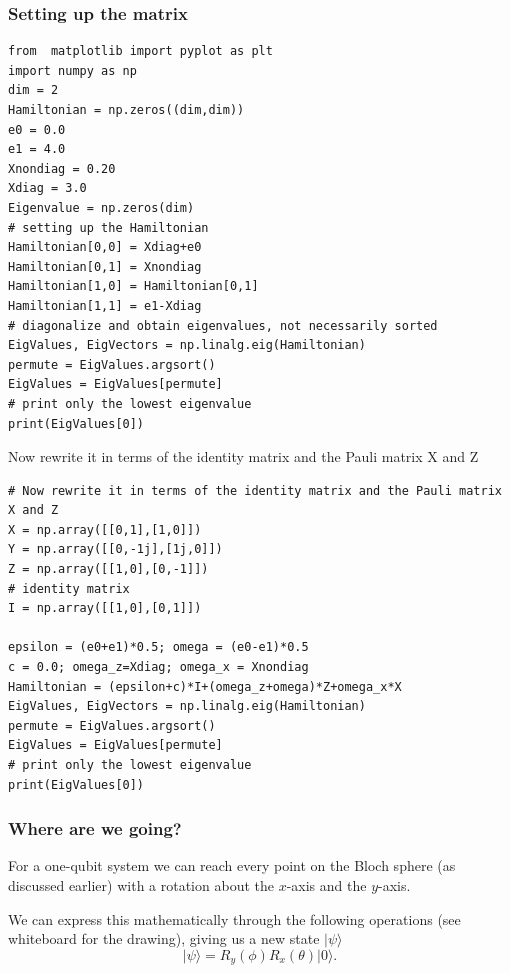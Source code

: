 \documentclass{beamer}
\begin{document}
\begin{frame}
\frametitle{Setting up the matrix}

\begin{verbatim}
from  matplotlib import pyplot as plt
import numpy as np
dim = 2
Hamiltonian = np.zeros((dim,dim))
e0 = 0.0
e1 = 4.0
Xnondiag = 0.20
Xdiag = 3.0
Eigenvalue = np.zeros(dim)
# setting up the Hamiltonian
Hamiltonian[0,0] = Xdiag+e0
Hamiltonian[0,1] = Xnondiag
Hamiltonian[1,0] = Hamiltonian[0,1]
Hamiltonian[1,1] = e1-Xdiag
# diagonalize and obtain eigenvalues, not necessarily sorted
EigValues, EigVectors = np.linalg.eig(Hamiltonian)
permute = EigValues.argsort()
EigValues = EigValues[permute]
# print only the lowest eigenvalue
print(EigValues[0])

\end{verbatim}


Now rewrite it in terms of the identity matrix and the Pauli matrix X and Z

















\begin{verbatim}
# Now rewrite it in terms of the identity matrix and the Pauli matrix X and Z
X = np.array([[0,1],[1,0]])
Y = np.array([[0,-1j],[1j,0]])
Z = np.array([[1,0],[0,-1]])
# identity matrix
I = np.array([[1,0],[0,1]])

epsilon = (e0+e1)*0.5; omega = (e0-e1)*0.5
c = 0.0; omega_z=Xdiag; omega_x = Xnondiag
Hamiltonian = (epsilon+c)*I+(omega_z+omega)*Z+omega_x*X
EigValues, EigVectors = np.linalg.eig(Hamiltonian)
permute = EigValues.argsort()
EigValues = EigValues[permute]
# print only the lowest eigenvalue
print(EigValues[0])

\end{verbatim}
\end{frame}

\begin{frame}
\frametitle{Where are we going?}

For a one-qubit system we can reach every point on the Bloch sphere
(as discussed earlier) with a rotation about the $x$-axis and the
$y$-axis.

We can express this mathematically through the following operations (see whiteboard for the drawing), giving us a new state $\vert \psi\rangle$
\[
\vert\psi\rangle = R_y(\phi)R_x(\theta)\vert 0 \rangle.
\]
\end{frame}
\end{document}
